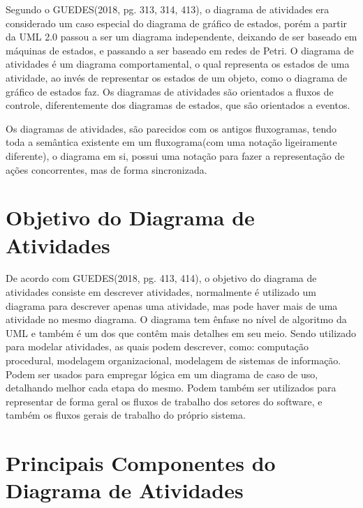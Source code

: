 \documentclass[12pt,openright,oneside,a4paper,
	chapter=TITLE,
	section=TITLE,
	english,brazil]{abntex2}
\begin{document}
Segundo o GUEDES(2018, pg. 313, 314, 413), o diagrama de atividades era considerado um caso especial do diagrama de gráfico de estados, porém a partir da UML 2.0 passou a ser um diagrama independente, deixando de ser baseado em máquinas de estados, e passando a ser baseado em redes de Petri. O diagrama de atividades é um diagrama comportamental, o qual representa os estados de uma atividade, ao invés de representar os estados de um objeto, como o diagrama de gráfico de estados faz. Os diagramas de atividades são orientados a fluxos de controle, diferentemente dos diagramas de estados, que são orientados a eventos.

Os diagramas de atividades, são parecidos com os antigos fluxogramas, tendo toda a semântica existente em um fluxograma(com uma notação ligeiramente diferente), o diagrama em si, possui uma notação para fazer a representação de ações concorrentes, mas de forma sincronizada.

\section{Objetivo do Diagrama de Atividades}

De acordo com GUEDES(2018, pg. 413, 414), o objetivo do diagrama de atividades consiste em descrever atividades, normalmente é utilizado um diagrama para descrever apenas uma atividade, mas pode haver mais de uma atividade no mesmo diagrama. O diagrama tem ênfase no nível de algoritmo da UML e também é um dos que contêm mais detalhes em seu meio. Sendo utilizado para modelar atividades, as quais podem descrever, como: computação procedural, modelagem organizacional, modelagem de sistemas de informação. Podem ser usados para empregar lógica em um diagrama de caso de uso, detalhando melhor cada etapa do mesmo. Podem também ser utilizados para representar de forma geral os fluxos de trabalho dos setores do software, e também os fluxos gerais de trabalho do próprio sistema.

\pagebreak
\section{Principais Componentes do Diagrama de Atividades}
\end{document}
